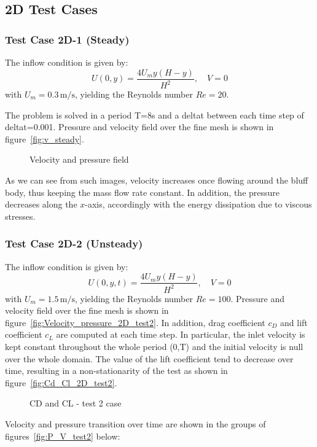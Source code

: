 \documentclass{article}
\begin{document}
\subsection{2D Test Cases}
\subsubsection{Test Case 2D-1 (Steady)}

The inflow condition is given by:
\[
U(0, y) = \frac{4U_m y (H - y)}{H^2}, \quad V = 0
\]
with \(U_m = 0.3 \, \text{m/s}\), yielding the Reynolds number \(Re = 20\). 

The problem is solved in a period T=8s and a deltat between each time step of deltat=0.001. 
Pressure and velocity field over the fine mesh is shown in figure~\ref{fig:v_steady}.

\begin{figure}
    \centering    
    \hfill
    \caption{Velocity and pressure field}
\end{figure}

As we can see from such images, velocity increases once flowing around the bluff body, thus keeping the mass flow rate constant. In addition, the pressure decreases along the \(x\)-axis, accordingly with the energy dissipation due to viscous stresses.
\vspace{1em} %


\subsubsection{Test Case 2D-2 (Unsteady)}
    The inflow condition is given by:
    \[
    U(0, y, t) = \frac{4U_m y (H - y)}{H^2}, \quad V = 0
    \]
    with \(U_m = 1.5 \, \text{m/s}\), yielding the Reynolds number \(Re = 100\). 
    Pressure and velocity field over the fine mesh is shown in figure~\ref{fig:Velocity_pressure_2D_test2}.
In addition, drag coefficient \(c_D\) and lift coefficient \(c_L\) are computed at each time step. In particular, the inlet velocity is kept constant throughout the whole period (0,T) and the initial velocity is null over the whole domain. The value of the lift coefficient tend to decrease over time, resulting in a non-stationarity of the test as shown in figure~\ref{fig:Cd_Cl_2D_test2}.
\begin{figure}
    \centering
    \hfill
    \caption{CD and CL - test 2 case}
    \label{fig:general_label}
\end{figure}
Velocity and pressure transition over time are shown in the groups of figures~\ref{fig:P_V_test2} below:
\end{document}
